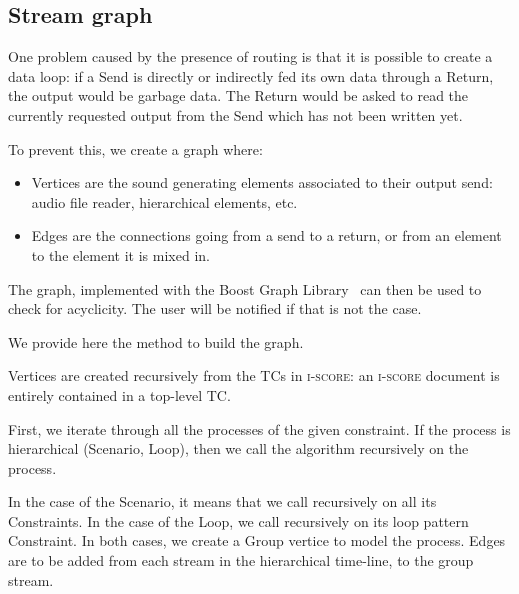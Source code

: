 \documentclass{article}
\newcommand*{\iscore}{\textsc{i-score}\xspace}
\newcommand*{\timeconstraint}{\ac{TC}\xspace}
\newcommand*{\timeconstraints}{\acp{TC}\xspace}
\begin{document}
\subsection{Stream graph}
One problem caused by the presence of routing is that it is possible 
to create a data loop: if a Send is directly or indirectly fed its own data through a Return, 
the output would be garbage data. 
The Return would be asked to read the currently requested output from the Send which has not been written yet.

To prevent this, we create a graph where: 
\begin{itemize}
	\item Vertices are the sound generating elements associated to their output send: audio file reader, hierarchical elements, etc.
	\item Edges are the connections going from a send to a return, or from an element to the element it is mixed in.
\end{itemize} 

The graph, implemented with the Boost Graph Library~\cite{siek2001boost} can then be used to 
check for acyclicity. 
The user will be notified if that is not the case.

We provide here the method to build the graph.

Vertices are created recursively from the \timeconstraints in \iscore: an \iscore document is entirely contained in a top-level \timeconstraint.

First, we iterate through all the processes of the given constraint.
If the process is hierarchical (Scenario, Loop), then we call the algorithm recursively on the process.

In the case of the Scenario, it means that we call recursively on all its Constraints.
In the case of the Loop, we call recursively on its loop pattern Constraint.
In both cases, we create a Group vertice to model the process. 
Edges are to be added from each stream in the hierarchical time-line, to the group stream.
\end{document}
